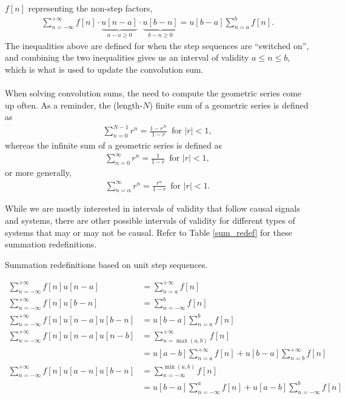 \documentclass{report}
\begin{document}
$f[n]$ representing the non-step factors, 
\begin{align}
    \sum_{n=-\infty}^{+\infty} f[n] \cdot \underbrace{u[n-a]}_\textrm{$n-a\geq 0$} \cdot \underbrace{u[b-n]}_\textrm{$b-n\geq 0$} = u[b-a]\sum_{n=a}^{b} f[n].
\end{align}
The inequalities above are defined for when the step sequences are ``switched on'', and combining the two inequalities gives us an interval of validity $a\leq n\leq b$, which is what is used to update the convolution sum.
\\ \\
When solving convolution sums, the need to compute the geometric series come up often. As a reminder, the (length-$N$) finite sum of a geometric series is defined as 
\begin{align}
    \sum_{n=0}^{N-1} r^n = \frac{1-r^N}{1-r}\, \text{ for } |r| < 1,
\end{align}
whereas the infinite sum of a geometric series is defined as 
\begin{align}
    \sum_{n=0}^{\infty} r^n = \frac{1}{1-r}\, \text{ for } |r| < 1,
\end{align}
or more generally, 
\begin{align}
    \sum_{n=\alpha}^{\infty} r^n = \frac{r^\alpha}{1-r}\, \text{ for } |r| < 1.
\end{align}

While we are mostly interested in intervals of validity that follow causal signals and systems, there are other possible intervals of validity for different 
types of systems that may or may not be causal. Refer to Table \ref{sum_redef} for these summation redefinitions. 
\begin{table}[hbt!]
    \centering
    \caption{Summation redefinitions based on unit step sequences.}
    \label{sum_redef}
    \begin{mdframed}
    \begin{align}
        \sum_{n=-\infty}^{+\infty} f[n] u[n-a] &= \sum_{n=a}^{+\infty} f[n] \\[0.25cm]
        \sum_{n=-\infty}^{+\infty} f[n] u[b-n] &= \sum_{n=-\infty}^{b} f[n] \\[0.25cm]
        \sum_{n=-\infty}^{+\infty} f[n] u[n-a] u[b-n] &= u[b-a]\sum_{n=a}^{b} f[n] \\[0.25cm]
        \sum_{n=-\infty}^{+\infty} f[n] u[n-a] u[n-b] &= \sum_{n=\max(a,b)}^{+\infty} f[n] \nonumber \\ 
        &= u[a-b] \sum_{n=a}^{+\infty} f[n] + u[b-a] \sum_{n=b}^{+\infty} f[n] \\[0.25cm] 
        \sum_{n=-\infty}^{+\infty} f[n] u[a-n] u[b-n] &= \sum_{n=-\infty}^{\min(a,b)} f[n] \nonumber \\ 
        &= u[b-a] \sum_{n=-\infty}^{a} f[n] + u[a-b] \sum_{n=-\infty}^{b} f[n] \\[0.15cm] \nonumber
    \end{align}
    \end{mdframed}
\end{table} 
\end{document}
